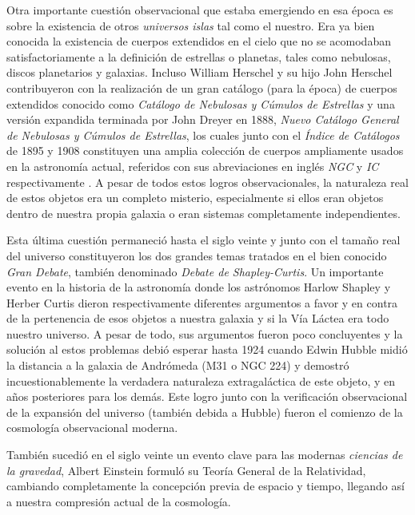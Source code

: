 Otra importante cuestión observacional que estaba emergiendo en esa época
es sobre la existencia de otros \textit{universos islas} tal como el nuestro.
Era ya bien conocida la existencia de cuerpos extendidos en el cielo que no
se acomodaban satisfactoriamente a la definición de estrellas o planetas,
tales como nebulosas, discos planetarios y galaxias. Incluso William Herschel
y su hijo John Herschel contribuyeron con la realización de un gran catálogo
(para la época) de cuerpos extendidos conocido como \textit{Catálogo de 
Nebulosas y Cúmulos de Estrellas} y una versión expandida terminada por
John Dreyer en 1888, \textit{Nuevo Catálogo General de Nebulosas y Cúmulos
de Estrellas}, los cuales junto con el \textit{Índice de Catálogos} de 
1895 y 1908 constituyen una amplia colección de cuerpos ampliamente usados
en la astronomía actual, referidos con sus abreviaciones en inglés \textit{NGC}
y \textit{IC} respectivamente \cite{longair2008}. A pesar de todos estos
logros observacionales, la naturaleza real de estos objetos era un completo 
misterio, especialmente si ellos eran objetos dentro de nuestra propia 
galaxia o eran sistemas completamente independientes.


Esta última cuestión permaneció hasta el siglo veinte y junto con el tamaño
real del universo constituyeron los dos grandes temas tratados en el bien
conocido \textit{Gran Debate}, también denominado \textit{Debate de 
Shapley-Curtis}. Un importante evento en la historia de la astronomía donde
los astrónomos Harlow Shapley y Herber Curtis dieron respectivamente 
diferentes argumentos a favor y en contra de la pertenencia de esos objetos
a nuestra galaxia y si la Vía Láctea era todo nuestro universo. A pesar de 
todo, sus argumentos fueron poco concluyentes y la solución al estos 
problemas debió esperar hasta 1924 cuando Edwin Hubble midió la distancia
a la galaxia de Andrómeda (M31 o NGC 224) y demostró incuestionablemente 
la verdadera naturaleza extragaláctica de este objeto, y en años posteriores
para los demás. Este logro junto con la verificación observacional de la 
expansión del universo (también debida a Hubble) fueron el comienzo de la 
cosmología observacional moderna.


También sucedió en el siglo veinte un evento clave para las modernas 
\textit{ciencias de la gravedad}, Albert Einstein formuló su Teoría
General de la Relatividad, cambiando completamente la concepción previa
de espacio y tiempo, llegando así a nuestra compresión actual de la 
cosmología.







